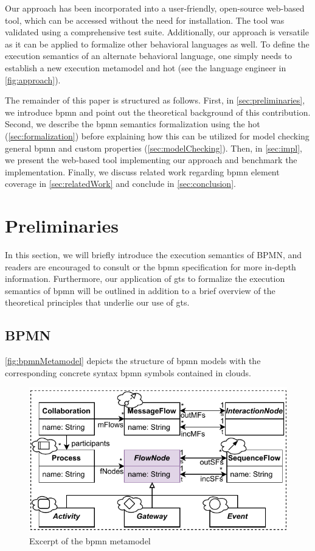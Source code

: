 \documentclass[runningheads]{llncs}
\begin{document}
Our approach has been incorporated into a user-friendly, open-source web-based tool, which can be accessed without the need for installation.
The tool was validated using a comprehensive test suite.
Additionally, our approach is versatile as it can be applied to formalize other behavioral languages as well. 
To define the execution semantics of an alternate behavioral language, one simply needs to establish a new execution metamodel and \gls*{hot} (see the language engineer in \autoref{fig:approach}).


The remainder of this paper is structured as follows.
First, in \autoref{sec:preliminaries}, we introduce \gls*{bpmn} and point out the theoretical background of this contribution.
Second, we describe the \gls*{bpmn} semantics formalization using the \gls*{hot} (\autoref{sec:formalization}) before explaining how this can be utilized for model checking general \gls*{bpmn} and custom properties (\autoref{sec:modelChecking}).
Then, in \autoref{sec:impl}, we present the web-based tool implementing our approach and benchmark the implementation.
Finally, we discuss related work regarding \gls*{bpmn} element coverage in \autoref{sec:relatedWork} and conclude in \autoref{sec:conclusion}.

\section{Preliminaries} \label{sec:preliminaries}

In this section, we will briefly introduce the execution semantics of BPMN, and readers are encouraged to consult \cite{freundRealLifeBPMNUsing2019} or the \gls*{bpmn} specification \cite{objectmanagementgroupBusinessProcessModel2013} for more in-depth information. 
Furthermore, our application of \gls*{gt}s to formalize the execution semantics of \gls*{bpmn} will be outlined in addition to a brief overview of the theoretical principles that underlie our use of \gls*{gt}s.



\subsection{BPMN}
\autoref{fig:bpmnMetamodel} depicts the structure of \gls*{bpmn} models with the corresponding concrete syntax \gls*{bpmn} symbols contained in clouds.

\begin{figure}[ht]
  \centering
  \includegraphics[width=0.7\linewidth]{images/bpmn_semantics-bpmn-metamodel.pdf}
  \caption{Excerpt of the \gls*{bpmn} metamodel \cite{objectmanagementgroupBusinessProcessModel2013}}
  \label{fig:bpmnMetamodel}
\end{figure}
\end{document}
